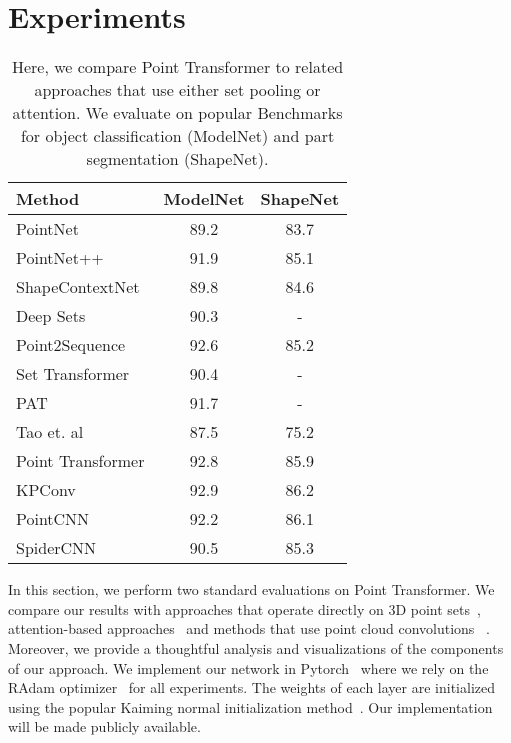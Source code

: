 \documentclass{ieeeaccess}
\begin{document}
\section{Experiments}\label{seq:05_exp}


\begin{table}[!t]
    \centering
        \caption{Here, we compare Point Transformer to related approaches that use either set pooling or attention. We evaluate on popular Benchmarks for object classification (ModelNet) and part segmentation (ShapeNet). }  
        \label{tab:modelnet40_results} 
        \begin{tabular}{@{}lcc@{}}
        \toprule
        Method             & ModelNet & ShapeNet \\ \midrule
        PointNet~\cite{qi2017pointnet}        & 89.2 &    83.7                          \\
        PointNet++~\cite{qi2017pointnet++}     & 91.9 &  85.1                            \\
         ShapeContextNet~\cite{xie2018attentional} & 89.8 &  84.6
            \\
        Deep Sets~\cite{zaheer2017deep}         & 90.3 &  -                           \\
       
        Point2Sequence~\cite{liu2019point2sequence} & 92.6 & 85.2                         \\
        Set Transformer~\cite{lee2019set}    & 90.4 &   -                           \\ 
        PAT~\cite{yang2019modeling}& 91.7 & - \\
        Tao et. al~\cite{9427563} & 87.5 & 75.2 \\
        Point Transformer & 92.8 & 85.9
        \\\midrule
        KPConv~\cite{thomas2019kpconv} & 92.9 &  86.2 \\
        PointCNN~\cite{li2018pointcnn} & 92.2 & 86.1 \\
SpiderCNN~\cite{xu2018spidercnn} & 90.5 & 85.3 \\
        \bottomrule
        \end{tabular}
 \end{table}


In this section, we perform two standard evaluations on Point Transformer. We compare our results with approaches that operate directly on 3D point sets~\cite{qi2017pointnet,qi2017pointnet++,zaheer2017deep}, attention-based approaches~\cite{xie2018attentional,lee2019set,liu2019point2sequence} and methods that use point cloud convolutions
~\cite{thomas2019kpconv,li2018pointcnn,wang2019dynamic,xu2018spidercnn}. Moreover, we provide a thoughtful analysis and visualizations of the components of our approach. We implement our network in Pytorch~\cite{paszke2017automatic} where we rely on the RAdam optimizer~\cite{liu2019variance} for all experiments. The weights of each layer are initialized using the popular Kaiming normal initialization method~\cite{he2015delving}. Our implementation will be made publicly available.
\end{document}
